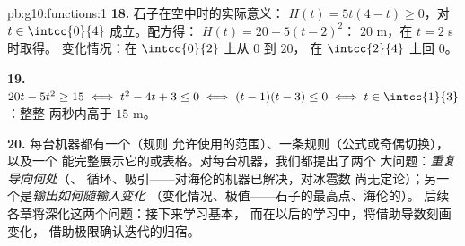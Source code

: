 \begin{solution}{pb:g10:functions:1}
\textbf{18.} 石子在空中时的实际意义：
$H(t) = 5t(4 - t) \geq 0$，对 $t \in \intcc{0}{4}$ 成立。配方得：
$H(t) = 20 - 5(t - 2)^2$： $20$ m，在 $t = 2$ s 时取得。
变化情况：在 $\intcc{0}{2}$ 上从 $0$ 到 $20$，
在 $\intcc{2}{4}$ 上回 $0$。

\textbf{19.} $20t - 5t^2 \geq 15 \iff t^2 - 4t + 3 \leq 0 \iff
(t - 1)(t - 3) \leq 0 \iff t \in \intcc{1}{3}$：整整
两秒内高于 $15$ m。

\textbf{20.} 每台机器都有一个（规则
允许使用的范围）、一条规则（公式或奇偶切换），以及一个
能完整展示它的或表格。对每台机器，我们都提出了两个
大问题：\emph{重复导向何处}（、
循环、吸引——对海伦的机器已解决，对冰雹数
尚无定论）；另一个是\emph{输出如何随输入变化}
（变化情况、极值——石子的最高点、海伦的）。
后续各章将深化这两个问题：接下来学习基本，
而在以后的学习中，将借助导数刻画变化，
借助极限确认迭代的归宿。
\end{solution}
